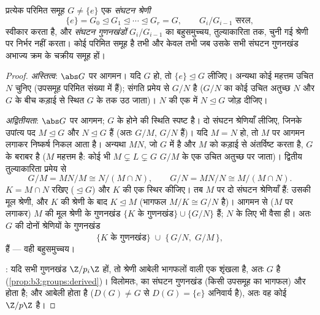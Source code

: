 \begin{theorem}[जॉर्डन--होल्डर]\label{thm:b3:groups:jordanholder}
प्रत्येक परिमित समूह $G \neq \{e\}$ एक \emph{संघटन
श्रेणी}
\[
\{e\} = G_0 \trianglelefteq G_1 \trianglelefteq \cdots
\trianglelefteq G_r = G,
\qquad G_{i}/G_{i-1} \text{ सरल},
\]
स्वीकार करता है, और \emph{संघटन गुणनखंडों} $G_i/G_{i-1}$ का बहुसमुच्चय,
तुल्याकारिता तक, चुनी गई श्रेणी पर निर्भर नहीं करता। कोई परिमित
समूह  है तभी और केवल तभी जब उसके सभी संघटन गुणनखंड अभाज्य
क्रम के चक्रीय समूह हों।
\end{theorem}

\begin{proof}
\emph{अस्तित्व}: $\abs G$ पर आगमन। यदि $G$  हो, तो $\{e\} \trianglelefteq G$
लीजिए। अन्यथा कोई महत्तम उचित  $N$ चुनिए
(उपसमूह परिमित संख्या में हैं); संगति प्रमेय से $G/N$  है
($G/N$ का कोई उचित अतुच्छ  $N$ और $G$ के
बीच कड़ाई से स्थित $G$ के  तक उठ जाता)।
$N$ की एक  में $N \trianglelefteq G$ जोड़ दीजिए।

\emph{अद्वितीयता}: $\abs G$ पर आगमन; $G$ के  होने की स्थिति
स्पष्ट है। दो संघटन श्रेणियाँ लीजिए, जिनके उपांत्य पद $M \trianglelefteq G$ और
$N \trianglelefteq G$ हैं (अतः $G/M$, $G/N$  हैं)। यदि $M = N$ हो, तो $M$ पर
आगमन लगाकर निष्कर्ष निकल आता है। अन्यथा $MN$, जो $G$ में
 है और $M$ को कड़ाई से अंतर्विष्ट करता है, $G$ के
बराबर है ($M$ महत्तम  है: कोई भी  $M \subsetneq L
\subsetneq G$
 $G/M$ के एक उचित अतुच्छ  पर जाता)। द्वितीय
तुल्याकारिता प्रमेय से
\[
G/M = MN/M \cong N/(M \cap N),
\qquad
G/N = MN/N \cong M/(M \cap N).
\]
$K = M \cap N$ रखिए ($\trianglelefteq G$) और $K$ की एक  स्थिर कीजिए। तब
$M$ पर दो संघटन श्रेणियाँ हैं: उसकी मूल श्रेणी, और $K$ की
श्रेणी के बाद $K \trianglelefteq
M$ (भागफल $M/K \cong G/N$  है)। आगमन से ($M$ पर
लगाकर) $M$ की मूल श्रेणी के गुणनखंड $\{K \text{ के गुणनखंड}\} \cup \{G/N\}$ हैं; $N$ के लिए
भी वैसा ही। अतः $G$ की दोनों श्रेणियों के गुणनखंड
\[
\{K \text{ के गुणनखंड}\} \;\cup\; \{\,G/N,\; G/M\,\},
\]
हैं --- वही बहुसमुच्चय।

: यदि सभी गुणनखंड $\Z/p_i\Z$ हों, तो श्रेणी आबेली भागफलों वाली
एक शृंखला है, अतः $G$  है (\cref{prop:b3:groups:derived})। विलोमतः, 
का संघटन गुणनखंड  (किसी उपसमूह का भागफल) और  होता है;
और   आबेली होता है ($D(G) \ne G$ से $D(G) = \{e\}$ अनिवार्य है),
अतः वह कोई $\Z/p\Z$ है।
\end{proof}

